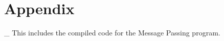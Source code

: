 \subsection{}

%



\newpage
\section{Appendix}
 \_\newline
This includes the compiled code for the Message Passing program.




